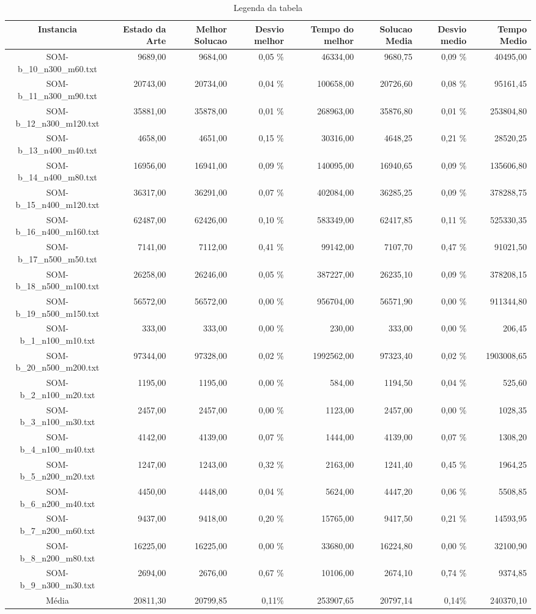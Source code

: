 \begin{landscape}
	\begin{table}[ht]
	\centering
	\begin{tabular}{| c | r | r | r | r | r | r | r |  }
\hline
Instancia&Estado da Arte&Melhor Solucao&Desvio melhor&Tempo do melhor&Solucao Media&Desvio medio&Tempo Medio\\ \hline 
		SOM-b\_10\_n300\_m60.txt&9689,00&9684,00&0,05 \%&46334,00&9680,75&0,09 \%&40495,00\\
		SOM-b\_11\_n300\_m90.txt&20743,00&20734,00&0,04 \%&100658,00&20726,60&0,08 \%&95161,45\\
		SOM-b\_12\_n300\_m120.txt&35881,00&35878,00&0,01 \%&268963,00&35876,80&0,01 \%&253804,80\\
		SOM-b\_13\_n400\_m40.txt&4658,00&4651,00&0,15 \%&30316,00&4648,25&0,21 \%&28520,25\\
		SOM-b\_14\_n400\_m80.txt&16956,00&16941,00&0,09 \%&140095,00&16940,65&0,09 \%&135606,80\\
		SOM-b\_15\_n400\_m120.txt&36317,00&36291,00&0,07 \%&402084,00&36285,25&0,09 \%&378288,75\\
		SOM-b\_16\_n400\_m160.txt&62487,00&62426,00&0,10 \%&583349,00&62417,85&0,11 \%&525330,35\\
		SOM-b\_17\_n500\_m50.txt&7141,00&7112,00&0,41 \%&99142,00&7107,70&0,47 \%&91021,50\\
		SOM-b\_18\_n500\_m100.txt&26258,00&26246,00&0,05 \%&387227,00&26235,10&0,09 \%&378208,15\\
		SOM-b\_19\_n500\_m150.txt&56572,00&56572,00&0,00 \%&956704,00&56571,90&0,00 \%&911344,80\\
		SOM-b\_1\_n100\_m10.txt&333,00&333,00&0,00 \%&230,00&333,00&0,00 \%&206,45\\
		SOM-b\_20\_n500\_m200.txt&97344,00&97328,00&0,02 \%&1992562,00&97323,40&0,02 \%&1903008,65\\
		SOM-b\_2\_n100\_m20.txt&1195,00&1195,00&0,00 \%&584,00&1194,50&0,04 \%&525,60\\
		SOM-b\_3\_n100\_m30.txt&2457,00&2457,00&0,00 \%&1123,00&2457,00&0,00 \%&1028,35\\
		SOM-b\_4\_n100\_m40.txt&4142,00&4139,00&0,07 \%&1444,00&4139,00&0,07 \%&1308,20\\
		SOM-b\_5\_n200\_m20.txt&1247,00&1243,00&0,32 \%&2163,00&1241,40&0,45 \%&1964,25\\
		SOM-b\_6\_n200\_m40.txt&4450,00&4448,00&0,04 \%&5624,00&4447,20&0,06 \%&5508,85\\
		SOM-b\_7\_n200\_m60.txt&9437,00&9418,00&0,20 \%&15765,00&9417,50&0,21 \%&14593,95\\
		SOM-b\_8\_n200\_m80.txt&16225,00&16225,00&0,00 \%&33680,00&16224,80&0,00 \%&32100,90\\
		SOM-b\_9\_n300\_m30.txt&2694,00&2676,00&0,67 \%&10106,00&2674,10&0,74 \%&9374,85\\
\hline 		Média&20811,30&20799,85&0,11\%&253907,65&20797,14&0,14\%&240370,10\\ 
\hline
	\end{tabular}
	\caption{Legenda da tabela}
	\label{seu_label}
	\end{table}
\end{landscape}
